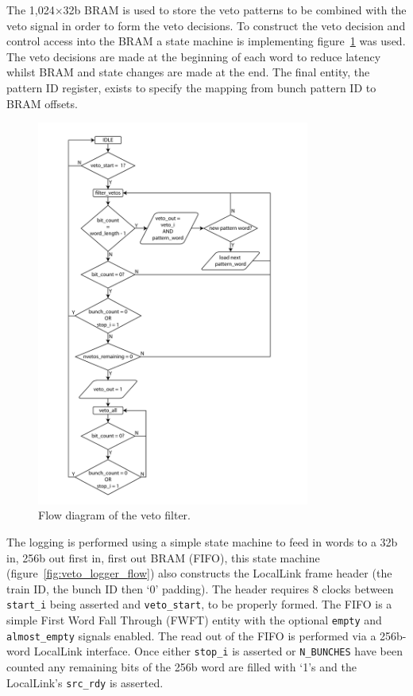The  1,024\( \times \)32b BRAM is used to store the veto patterns to be combined with the veto signal in order to form the veto decisions. To construct the veto decision and control access into the BRAM a state machine is implementing figure~\ref{fig:veto_filter_flow} was used. The veto decisions are made at the beginning of each word to reduce latency whilst BRAM and state changes are made at the end. The final entity, the pattern ID register, exists to specify the mapping from bunch pattern ID to BRAM offsets.
    
\begin{figure}[htbp]
  \centering
  \includegraphics[width=0.8\textwidth]{images/pdfs/veto_filter_flow.pdf}
  \caption{Flow diagram of the veto filter.}
  \label{fig:veto_filter_flow}
\end{figure}
    
The logging is performed using a simple state machine to feed in words to a 32b in, 256b out first in, first out BRAM (FIFO), this state machine (figure~\ref{fig:veto_logger_flow}) also constructs the LocalLink frame header (the train ID, the bunch ID then `0' padding). The header requires 8 clocks between \texttt{start\_i} being asserted and \texttt{veto\_start}, to be properly formed. The FIFO is a simple First Word Fall Through (FWFT) entity with the optional \texttt{empty} and \texttt{almost\_empty} signals enabled. The read out of the FIFO is performed via a 256b-word LocalLink interface. Once either \texttt{stop\_i} is asserted or \texttt{N\_BUNCHES} have been counted any remaining bits of the 256b word are filled with `1's and the LocalLink's \texttt{src\_rdy} is asserted. 
    
